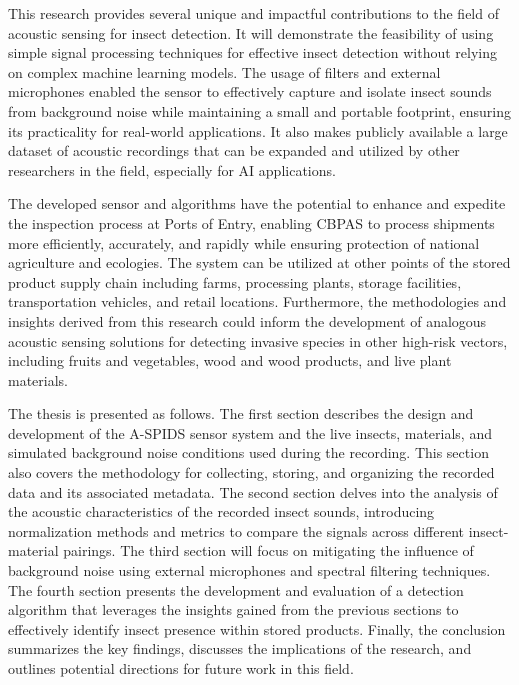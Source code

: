 This research provides several unique and impactful contributions to the field of acoustic sensing for insect detection. It will demonstrate the feasibility of using simple signal processing techniques for effective insect detection without relying on complex machine learning models. The usage of filters and external microphones enabled the sensor to effectively capture and isolate insect sounds from background noise while maintaining a small and portable footprint, ensuring its practicality for real-world applications. It also makes publicly available a large dataset of acoustic recordings that can be expanded and utilized by other researchers in the field, especially for AI applications. 

The developed sensor and algorithms have the potential to enhance and expedite the inspection process at Ports of Entry, enabling CBPAS to process shipments more efficiently, accurately, and rapidly while ensuring protection of national agriculture and ecologies. The system can be utilized at other points of the stored product supply chain including farms, processing plants, storage facilities, transportation vehicles, and retail locations. Furthermore, the methodologies and insights derived from this research could inform the development of analogous acoustic sensing solutions for detecting invasive species in other high-risk vectors, including fruits and vegetables, wood and wood products, and live plant materials.

The thesis is presented as follows. The first section describes the design and development of the A-SPIDS sensor system and the live insects, materials, and simulated background noise conditions used during the recording. This section also covers the methodology for collecting, storing, and organizing the recorded data and its associated metadata. The second section delves into the analysis of the acoustic characteristics of the recorded insect sounds, introducing normalization methods and metrics to compare the signals across different insect-material pairings. The third section will focus on mitigating the influence of background noise using external microphones and spectral filtering techniques. The fourth section presents the development and evaluation of a detection algorithm that leverages the insights gained from the previous sections to effectively identify insect presence within stored products. Finally, the conclusion summarizes the key findings, discusses the implications of the research, and outlines potential directions for future work in this field.

\newpage